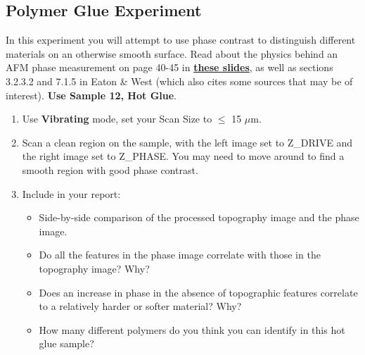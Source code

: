 \documentclass{../lab}
\begin{document}





\subsection{Polymer Glue Experiment}
\label{subsec:GlueStick}

In this experiment you will attempt to use phase contrast to distinguish different materials on an otherwise smooth surface. Read about the physics behind an AFM phase measurement on page 40-45 in \href{https://berkeley-physics111b.github.io/assets/pdf/oldwebsitestructure/AFMImages/Lecture\_10\_AFM.pdf}{\textbf{these slides}},  as well as sections 3.2.3.2 and 7.1.5 in Eaton \& West (which also cites some sources that may be of interest). \textbf{Use Sample 12, Hot Glue}.


\begin{enumerate}
    \item Use \textbf{Vibrating} mode, set your Scan Size to $\leq$ 15 $\mu$m.

    \item Scan a clean region on the sample, with the left image set to Z\_DRIVE and the right image set to Z\_PHASE. You may need to move around to find a smooth region with good phase contrast.
    
    \item Include in your report:
        \begin{itemize}
            \item Side-by-side comparison of the processed topography image and the phase image.
            \item Do all the features in the phase image correlate with those in the topography image? Why? 
            \item Does an increase in phase in the absence of topographic features correlate to a relatively harder or softer material? Why?
            \item How many different polymers do you think you can identify in this hot glue sample?
        
        \end{itemize}


\end{enumerate}
\end{document}
